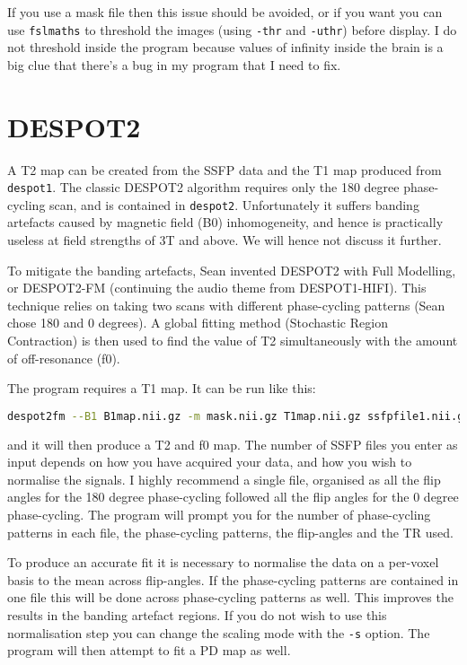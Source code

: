 \documentclass{report}
\begin{document}
If you use a mask file then this issue should be avoided, or if you want you can use \texttt{fslmaths} to threshold the images (using \texttt{-thr} and \texttt{-uthr}) before display. I do not threshold inside the program because values of infinity inside the brain is a big clue that there's a bug in my program that I need to fix.

\section{DESPOT2}

A T2 map can be created from the SSFP data and the T1 map produced from \texttt{despot1}. The classic DESPOT2 algorithm requires only the 180 degree phase-cycling scan, and is contained in \texttt{despot2}. Unfortunately it suffers banding artefacts caused by magnetic field (B0) inhomogeneity, and hence is practically useless at field strengths of 3T and above. We will hence not discuss it further.

To mitigate the banding artefacts, Sean invented DESPOT2 with Full Modelling, or DESPOT2-FM (continuing the audio theme from DESPOT1-HIFI). This technique relies on taking two scans with different phase-cycling patterns (Sean chose 180 and 0 degrees). A global fitting method (Stochastic Region Contraction) is then used to find the value of T2 simultaneously with the amount of off-resonance (f0).

The program requires a T1 map. It can be run like this:

\begin{lstlisting}[language=sh]
despot2fm --B1 B1map.nii.gz -m mask.nii.gz T1map.nii.gz ssfpfile1.nii.gz ssfpfile2.nii.gz
\end{lstlisting}

and it will then produce a T2 and f0 map. The number of SSFP files you enter as input depends on how you have acquired your data, and how you wish to normalise the signals. I highly recommend a single file, organised as all the flip angles for the 180 degree phase-cycling followed all the flip angles for the 0 degree phase-cycling. The program will prompt you for the number of phase-cycling patterns in each file, the phase-cycling patterns, the flip-angles and the TR used.

To produce an accurate fit it is necessary to normalise the data on a per-voxel basis to the mean across flip-angles. If the phase-cycling patterns are contained in one file this will be done across phase-cycling patterns as well. This improves the results in the banding artefact regions. If you do not wish to use this normalisation step you can change the scaling mode with the \texttt{-s} option. The program will then attempt to fit a PD map as well.
\end{document}

